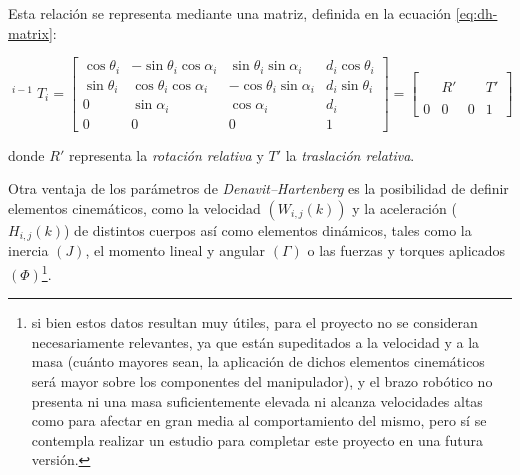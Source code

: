 Esta relación se representa mediante una matriz, definida en la ecuación \ref{eq:dh-matrix}:

\begin{equation}
    \label{eq:dh-matrix}
    {
    \displaystyle \operatorname {}
    ^{i-1}T_{i}=\left[{
                \begin{array}{ccc|c}
                    \cos{\theta_{i}} & -\sin{\theta_{i}}\cos{\alpha_{i}} & \sin{\theta_{i}}\sin{\alpha_{i}}  & d_{i}\cos{\theta_{i}} \\
                    \sin{\theta_{i}} & \cos{\theta_{i}}\cos{\alpha_{i}}  & -\cos{\theta_{i}}\sin{\alpha_{i}} & d_{i}\sin{\theta_{i}} \\
                    0                & \sin{\alpha_{i}}                  & \cos{\alpha_{i}}                  & d_{i}                 \\
                    \hline
                    0                & 0                                 & 0                                 & 1
                \end{array}}\right] =
    \left[{
                \begin{array}{ccc|c}
                      &   &   &   \\
                      & R' &   & T' \\
                      &   &   &   \\
                    \hline
                    0 & 0 & 0 & 1
                \end{array}}
        \right]
    }
\end{equation}

donde $R'$ representa la \textit{rotación relativa} y $T'$ la \textit{traslación relativa}.

Otra ventaja de los parámetros de \textit{Denavit--Hartenberg} es la posibilidad de
definir elementos cinemáticos, como la velocidad $\left(W_{i,j}(k)\right)$ y la aceleración ($H_{i,j}(k)$)
de distintos cuerpos así como elementos dinámicos, tales como la inercia $\left(J\right)$,
el momento lineal y angular $\left(\Gamma\right)$ o las fuerzas y torques aplicados
$\left(\Phi\right)$\footnote{si bien estos datos resultan muy útiles, para el proyecto no se consideran
    necesariamente relevantes, ya que están supeditados a la velocidad y a la masa (cuánto mayores sean,
    la aplicación de dichos elementos cinemáticos será mayor sobre los componentes del
    manipulador), y el brazo robótico no presenta ni una masa suficientemente elevada ni alcanza velocidades altas
    como para afectar en gran media al comportamiento del mismo, pero sí se contempla realizar un estudio para completar
    este proyecto en una futura versión.}.

